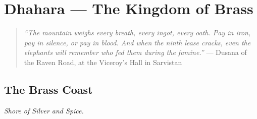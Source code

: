 \part{Dhahara --- The Kingdom of Brass}
\begin{quote}
  \small
  \textit{``The mountain weighs every breath, every ingot, every oath. Pay in iron, pay in silence, or pay in blood. And when the ninth lease cracks, even the elephants will remember who fed them during the famine.''}
  \noindent --- Dusana of the Raven Road, at the Viceroy's Hall in Sarvistan
  \end{quote}
\chapter{The Brass Coast}
\emph{Shore of Silver and Spice.}

